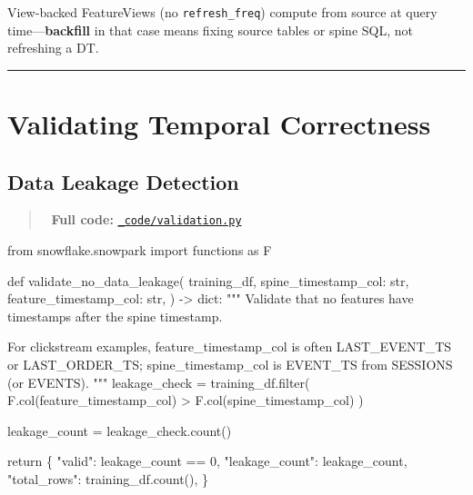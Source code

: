 \documentclass[
  letterpaper,
  DIV=11,
  numbers=noendperiod]{scrreprt}
\newenvironment{Shaded}{\begin{snugshade}}{\end{snugshade}}
\newcommand{\BuiltInTok}[1]{\textcolor[rgb]{0.00,0.23,0.31}{#1}}
\newcommand{\CommentTok}[1]{\textcolor[rgb]{0.37,0.37,0.37}{#1}}
\newcommand{\ControlFlowTok}[1]{\textcolor[rgb]{0.00,0.23,0.31}{#1}}
\newcommand{\DecValTok}[1]{\textcolor[rgb]{0.68,0.00,0.00}{#1}}
\newcommand{\ImportTok}[1]{\textcolor[rgb]{0.00,0.46,0.62}{#1}}
\newcommand{\KeywordTok}[1]{\textcolor[rgb]{0.00,0.23,0.31}{#1}}
\newcommand{\NormalTok}[1]{\textcolor[rgb]{0.00,0.23,0.31}{#1}}
\newcommand{\OperatorTok}[1]{\textcolor[rgb]{0.37,0.37,0.37}{#1}}
\newcommand{\StringTok}[1]{\textcolor[rgb]{0.13,0.47,0.30}{#1}}
\begin{document}
View-backed FeatureViews (no \texttt{refresh\_freq}) compute from source
at query time---\textbf{backfill} in that case means fixing source
tables or spine SQL, not refreshing a DT.

\begin{center}\rule{0.5\linewidth}{0.5pt}\end{center}

\hypertarget{validating-temporal-correctness}{%
\section{Validating Temporal
Correctness}\label{validating-temporal-correctness}}

\hypertarget{data-leakage-detection}{%
\subsection{Data Leakage Detection}\label{data-leakage-detection}}

\begin{quote}
📁 \textbf{Full code:}
\href{_code/validation.py}{\texttt{\_code/validation.py}}
\end{quote}

\begin{Shaded}
\begin{Highlighting}[]
\ImportTok{from}\NormalTok{ snowflake.snowpark }\ImportTok{import}\NormalTok{ functions }\ImportTok{as}\NormalTok{ F}

\KeywordTok{def}\NormalTok{ validate\_no\_data\_leakage(}
\NormalTok{    training\_df,}
\NormalTok{    spine\_timestamp\_col: }\BuiltInTok{str}\NormalTok{,}
\NormalTok{    feature\_timestamp\_col: }\BuiltInTok{str}\NormalTok{,}
\NormalTok{) }\OperatorTok{{-}\textgreater{}} \BuiltInTok{dict}\NormalTok{:}
    \CommentTok{"""}
\CommentTok{    Validate that no features have timestamps after the spine timestamp.}

\CommentTok{    For clickstream examples, feature\_timestamp\_col is often LAST\_EVENT\_TS or}
\CommentTok{    LAST\_ORDER\_TS; spine\_timestamp\_col is EVENT\_TS from SESSIONS (or EVENTS).}
\CommentTok{    """}
\NormalTok{    leakage\_check }\OperatorTok{=}\NormalTok{ training\_df.}\BuiltInTok{filter}\NormalTok{(}
\NormalTok{        F.col(feature\_timestamp\_col) }\OperatorTok{\textgreater{}}\NormalTok{ F.col(spine\_timestamp\_col)}
\NormalTok{    )}

\NormalTok{    leakage\_count }\OperatorTok{=}\NormalTok{ leakage\_check.count()}

    \ControlFlowTok{return}\NormalTok{ \{}
        \StringTok{"valid"}\NormalTok{: leakage\_count }\OperatorTok{==} \DecValTok{0}\NormalTok{,}
        \StringTok{"leakage\_count"}\NormalTok{: leakage\_count,}
        \StringTok{"total\_rows"}\NormalTok{: training\_df.count(),}
\NormalTok{    \}}
\end{Highlighting}
\end{Shaded}
\end{document}
